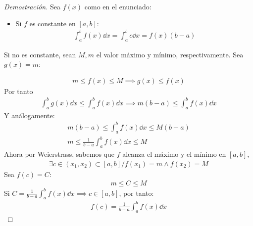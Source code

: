 \documentclass{article}
\begin{document}
\begin{proof}[Demostración]
    Sea $f(x)$ como en el enunciado:
    \begin{itemize}
        \item Si $f$ es constante en $[a,b]$:
        \begin{equation}
            \begin{split}
                \int _{a}^b f(x) \dd{x} = \int _{a}^b c \dd{x} = f(x)(b-a)
            \end{split}
        \end{equation}
    \end{itemize}
    \item Si no es constante, sean $M,m$ el valor máximo y mínimo, respectivamente. Sea $g(x) = m$:
    \item \begin{equation}
        \begin{split}
            m \leq f(x) \leq M \implies g(x) \leq f(x)
        \end{split}
    \end{equation}
    Por tanto
    \begin{equation}
        \begin{split}
            \int _{a}^b g(x) \dd{x} \leq \int _{a}^b f(x) \dd{x} \implies m(b-a) \leq \int _{a}^b f(x) \dd{x}
        \end{split}
    \end{equation}
    Y análogamente:
    \begin{equation}
        \begin{split}
            m(b-a) \leq \int _{a}^b f(x) \dd{x} \leq M(b-a)\\
            m \leq \frac{1}{b-a} \int _{a}^b f(x) \dd{x} \leq M
        \end{split}
    \end{equation}
    Ahora por Weierstrass, sabemos que $f$ alcanza el máximo y el mínimo en $[a,b]$,
    \begin{equation}
        \begin{split}
            \exists c \in (x_{1},x_{2}) \subset [a,b] / f(x_{1})=m \wedge f(x_{2})=M
        \end{split}
    \end{equation}
    Sea $f(c)=C$:
    \begin{equation}
        \begin{split}
            m \leq C \leq M
        \end{split}
    \end{equation}
    Si $C= \frac{1}{b-a} \int _{a}^b f(x) \dd{x} \implies  c \in [a,b]$, por tanto:
    \begin{equation}
        \begin{split}
            f(c)= \frac{1}{b-a} \int _{a}^b f(x) \dd{x}
        \end{split}
    \end{equation}

\end{proof}
\end{document}
